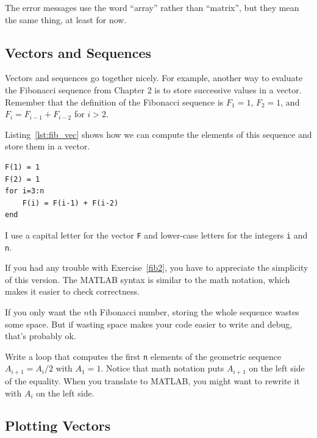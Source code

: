 The error messages use the word ``array'' rather than ``matrix'', 
but they mean the same thing, at least for now.


\subsection{Vectors and Sequences}


Vectors and sequences go together nicely.
For example, another way to evaluate the Fibonacci sequence from Chapter 2 is to
store successive values in a vector.  Remember that the definition of the
Fibonacci sequence is $F_1 = 1$, $F_2 = 1$, and $F_{i} = F_{i-1} +
F_{i-2}$ for $i > 2$.

Listing~\ref{lst:fib_vec} shows how we can compute the elements of this sequence and store them in a vector.

\begin{lstlisting}[caption={Calculating the Fibonacci sequence using a vector }, label={lst:fib_vec}]
F(1) = 1
F(2) = 1
for i=3:n
    F(i) = F(i-1) + F(i-2)
end
\end{lstlisting}

I use a capital letter for the vector {\tt F}
and lower-case letters for the integers {\tt i} and {\tt n}.

If you had any trouble with Exercise~\ref{fib2}, you have to
appreciate the simplicity of this version.  The MATLAB syntax is
similar to the math notation, which makes it easier to check
correctness.  

If you only want the $n$th Fibonacci number, storing
the whole sequence wastes some space.  But if wasting space
makes your code easier to write and debug, that's probably ok.

\begin{ex}
Write a loop that computes the first {\tt n} elements
of the geometric sequence $A_{i+1} = A_i/2$ with $A_1 = 1$.  Notice that
math notation puts $A_{i+1}$ on the left side of the equality.
When you translate to MATLAB, you might want to rewrite it with
$A_{i}$ on the left side.
\end{ex}


\subsection{Plotting Vectors}


